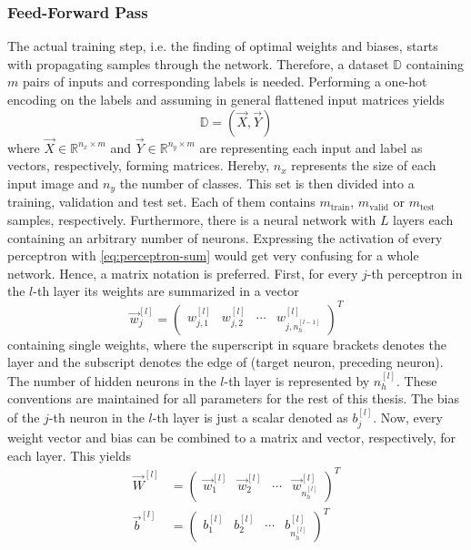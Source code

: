 \subsubsection{Feed-Forward Pass}
\label{sec:training-forward-pass}
The actual training step, i.e. the finding of optimal weights and biases, starts with propagating samples through the network.
Therefore, a dataset $\mathbb{D}$ containing $m$ pairs of inputs and corresponding labels is needed.
Performing a one-hot encoding on the labels and assuming in general flattened input matrices yields
\begin{equation}
	\label{eq:dataset-one-hot}
	\mathbb{D} = \left( \vec{X} , \vec{Y} \right)
\end{equation}
where $\vec{X} \in \mathbb{R}^{n_x \times m}$ and $\vec{Y} \in \mathbb{R}^{n_y \times m}$ are representing each input and label as vectors, respectively, forming matrices.
Hereby, $n_x$ represents the size of each input image and $n_y$ the number of classes.
This set is then divided into a training, validation and test set.
Each of them contains $m_{\text{train}}$, $m_{\text{valid}}$ or $m_{\text{test}}$ samples, respectively.
Furthermore, there is a neural network with $L$ layers each containing an arbitrary number of neurons.
Expressing the activation of every perceptron with \eqref{eq:perceptron-sum} would get very confusing for a whole network.
Hence, a matrix notation is preferred.
First, for every $j$-th perceptron in the $l$-th layer its weights are summarized in a vector
\begin{equation}
	\label{eq:weights-vector}
	\vec{w}^{[l]}_j =
	\begin{pmatrix}
		w^{[l]}_{j,1} & w^{[l]}_{j,2} & \cdots & w^{[l]}_{j,n^{[l-1]}_h}
	\end{pmatrix}^T
\end{equation}
containing single weights, where the superscript in square brackets denotes the layer and the subscript denotes the edge of (target neuron, preceding neuron).
The number of hidden neurons in the $l$-th layer is represented by $n^{[l]}_h$.
These conventions are maintained for all parameters for the rest of this thesis.
The bias of the $j$-th neuron in the $l$-th layer is just a scalar denoted as $b^{[l]}_j$. 
Now, every weight vector and bias can be combined to a matrix and vector, respectively, for each layer.
This yields
\begin{subequations}
\label{eq:parameters}
	\begin{align}
		\vec{W}^{[l]} &=
		\begin{pmatrix}
			\vec{w}^{[l]}_1 & \vec{w}^{[l]}_2 & \cdots & \vec{w}^{[l]}_{n^{[l]}_h}
		\end{pmatrix}^T
		\label{eq:weights}
		\\
		\vec{b}^{[l]} &=
			\begin{pmatrix}
				b^{[l]}_1 & b^{[l]}_2 & \cdots & b^{[l]}_{n^{[l]}_h}
			\end{pmatrix}^T
		\label{eq:biases}
	\end{align}
\end{subequations}
